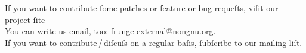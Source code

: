 \documentclass[
  ngerman,
  titlepage=no
]{scrartcl}
\let\addpart\addsec   %
\begin{document}
\addpart[contact]{Contact}
If you want to contribute ſome patches or feature or bug requeſts, viſit our
\href{http://ſv.nongnu.org/p/frunge}{project ſite}\\
\hypertarget{contact}{You can write us email, too:
\href{mailto:frunge-external@nongnu.org}{frunge-external@nongnu.org}}.\\
If you want to contribute\,/\,diſcuſs on a regular baſis, ſubſcribe to our
\href{http://liſts.nongnu.org/mailman/listinfo/frunge-internal}{mailing
liſt}.


\end{document}
